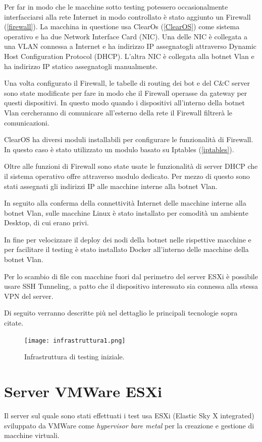 Per far in modo che le macchine sotto testing potessero occasionalmente interfacciarsi alla rete Internet in modo controllato è stato aggiunto un Firewall (\ref{firewall}). La macchina in questione usa  ClearOs (\ref{ClearOS}) come sistema operativo e ha due Network Interface Card (NIC).
Una delle NIC è collegata a una VLAN connessa a Internet e ha indirizzo IP assegnatogli attraverso Dynamic Host Configuration Protocol (DHCP). L'altra NIC è collegata alla botnet Vlan e ha indirizzo IP statico assegnatogli manualmente. 

Una volta configurato il Firewall, le tabelle di routing dei bot e del C\&C server sono state modificate per fare in modo che il Firewall operasse da gateway per questi dispositivi. In questo modo quando i dispositivi all'interno della botnet Vlan cercheranno di comunicare all'esterno della rete il Firewall filtrerà le comunicazioni.

ClearOS ha diversi moduli installabili per configurare le funzionalità di Firewall. In questo caso è stato utilizzato un modulo basato su Iptables (\ref{iptables}).
    
Oltre alle funzioni di Firewall sono state usate le funzionalità di server DHCP che il sistema operativo offre attraverso modulo dedicato. Per mezzo di  questo sono stati assegnati gli indirizzi IP alle macchine interne alla botnet Vlan.

In seguito alla conferma della connettività  Internet delle macchine interne alla botnet Vlan,  sulle macchine Linux è stato installato per comodità un ambiente Desktop, di cui erano privi.

In fine per velocizzare il deploy dei nodi della botnet nelle rispettive macchine  e per facilitare il testing è stato installato Docker all'interno delle macchine della  botnet Vlan.

Per lo scambio di file con macchine fuori dal perimetro del server ESXi è possibile usare SSH Tunneling, a patto che il dispositivo interessato sia connessa alla stessa VPN del server.
    
Di seguito verranno descritte più nel dettaglio le principali tecnologie sopra citate.

\begin{figure}[hbtp]
    \centering
    \texttt{[image: infrastruttura1.png]}
    \caption{Infrastruttura di testing iniziale.}
    \label{fig:infrastruttura1}
\end{figure}

\section{Server VMWare ESXi}
\label{esxi}
Il server sul quale sono stati effettuati i test usa  ESXi (Elastic Sky X integrated) \cite{esxi} sviluppato da VMWare come \textit{hypervisor bare metal} per la creazione e  gestione di macchine virtuali.


